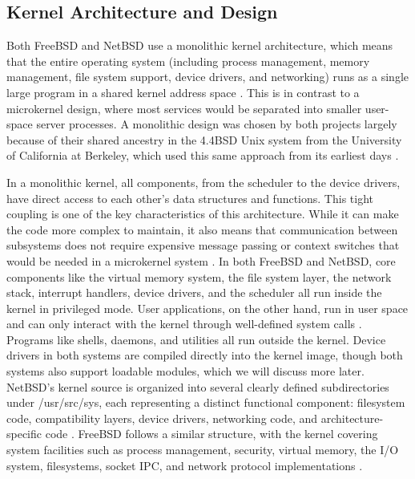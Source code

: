 \subsection{Kernel Architecture and Design}
Both FreeBSD and NetBSD use a monolithic kernel architecture, which means that the entire operating system (including process management, memory management, file system support, device drivers, and networking) runs as a single large program in a shared kernel address space \parencite{watson2015}. This is in contrast to a microkernel design, where most services would be separated into smaller user-space server processes. A monolithic design was chosen by both projects largely because of their shared ancestry in the 4.4BSD Unix system from the University of California at Berkeley, which used this same approach from its earliest days \parencite{watson2015}.

In a monolithic kernel, all components, from the scheduler to the device drivers, have direct access to each other's data structures and functions. This tight coupling is one of the key characteristics of this architecture. While it can make the code more complex to maintain, it also means that communication between subsystems does not require expensive message passing or context switches that would be needed in a microkernel system \parencite{watson2015}.
In both FreeBSD and NetBSD, core components like the virtual memory system, the file system layer, the network stack, interrupt handlers, device drivers, and the scheduler all run inside the kernel in privileged mode. User applications, on the other hand, run in user space and can only interact with the kernel through well-defined system calls \parencite{watson2015}. Programs like shells, daemons, and utilities all run outside the kernel. Device drivers in both systems are compiled directly into the kernel image, though both systems also support loadable modules, which we will discuss more later.
NetBSD's kernel source is organized into several clearly defined subdirectories under /usr/src/sys, each representing a distinct functional component: filesystem code, compatibility layers, device drivers, networking code, and architecture-specific code \parencite{feyrer2002}. FreeBSD follows a similar structure, with the kernel covering system facilities such as process management, security, virtual memory, the I/O system, filesystems, socket IPC, and network protocol implementations \parencite{watson2015}.

